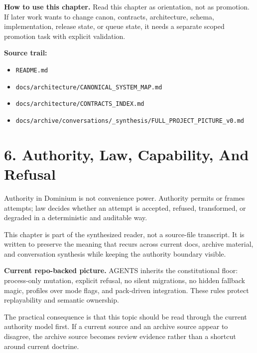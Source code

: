\documentclass[10.5pt,a4paper,openany]{book}
\begin{document}
\textbf{How to use this chapter.} Read this chapter as orientation, not as promotion.\allowbreak{} If later work wants to change canon, contracts, architecture, schema, implementation, release state, or queue state, it needs a separate scoped promotion task with explicit validation.\allowbreak{}


\textbf{Source trail:}


\begin{itemize}
\item \texttt{README.\allowbreak{}md}
\item \texttt{docs/\allowbreak{}architecture/\allowbreak{}CANONICAL\_\allowbreak{}SYSTEM\_\allowbreak{}MAP.\allowbreak{}md}
\item \texttt{docs/\allowbreak{}architecture/\allowbreak{}CONTRACTS\_\allowbreak{}INDEX.\allowbreak{}md}
\item \texttt{docs/\allowbreak{}archive/\allowbreak{}conversations/\allowbreak{}\_\allowbreak{}synthesis/\allowbreak{}FULL\_\allowbreak{}PROJECT\_\allowbreak{}PICTURE\_\allowbreak{}v0.\allowbreak{}md}
\end{itemize}


\section{6. Authority, Law, Capability, And Refusal}

Authority in Dominium is not convenience power.\allowbreak{} Authority permits or frames attempts; law decides whether an attempt is accepted, refused, transformed, or degraded in a deterministic and auditable way.\allowbreak{}


This chapter is part of the synthesized reader, not a source-\allowbreak{}file transcript.\allowbreak{} It is written to preserve the meaning that recurs across current docs, archive material, and conversation synthesis while keeping the authority boundary visible.\allowbreak{}


\textbf{Current repo-backed picture.} AGENTS inherits the constitutional floor: process-\allowbreak{}only mutation, explicit refusal, no silent migrations, no hidden fallback magic, profiles over mode flags, and pack-\allowbreak{}driven integration.\allowbreak{} These rules protect replayability and semantic ownership.\allowbreak{}


The practical consequence is that this topic should be read through the current authority model first.\allowbreak{} If a current source and an archive source appear to disagree, the archive source becomes review evidence rather than a shortcut around current doctrine.\allowbreak{}
\end{document}
